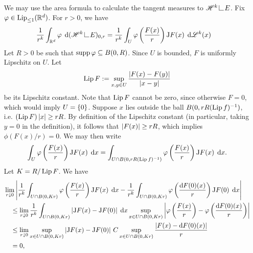 We may use the area formula to calculate the tangent measures to $\scrH^k \restrict E$. Fix $\varphi \in \operatorname{Lip}_{\leq 1}(\mathbb{R}^d)$. For $r > 0$, we have 
\begin{equation} \begin{aligned} 
    \frac{1}{r^k} \int_{\bbR^d} \phi \; \d (\scrH^k \restrict E)_{0,r} &= \frac{1}{r^k} \int_{U} \phi\left(\frac{F(x)}{r}\right) \mathrm{J}F(x) \; \d \scrL^k(x)
\end{aligned} \end{equation}
Let $R > 0$ be such that $\operatorname{supp}{\varphi} \subseteq B(0,R)$. Since $U$ is bounded, $F$ is uniformly Lipschitz on $U$. Let 
\begin{equation}
    \operatorname{Lip}{F} := \sup_{x,y \in U} \frac{\left\vert {F(x) - F(y)} \right\vert}{\left\vert {x - y} \right\vert}
\end{equation}
be its Lipschitz constant. Note that $\operatorname{Lip}{F}$ cannot be zero, since otherwise $F = 0$, which would imply $U = \left\{ {0} \right\}$. Suppose $x$ lies outside the ball $B(0,rR(\operatorname{Lip}{f})^{-1})$, i.e. $(\operatorname{Lip}{F})\left\vert {x} \right\vert \geq rR$. By definition of the Lipschitz constant (in particular, taking $y = 0$ in the definition), it follows that $\left\vert {F(x)} \right\vert \geq rR$, which implies $\phi(F(x)/r) = 0$. We may then write 
\begin{equation}
    \int_U \varphi\left( { \frac{F(x)}{r} } \right) \mathrm{J}F(x) \; \operatorname{d}\!{x} = \int_{U \cap B(0,rR(\operatorname{Lip}{f})^{-1})} \varphi\left( { \frac{F(x)}{r} } \right)  \mathrm{J}F(x) \; \operatorname{d}\!{x}.
\end{equation}
Let $K = R/\operatorname{Lip}{F}$. We have 
\begin{equation} \begin{aligned}
    &\lim_{r \downarrow 0} \left\vert { \frac{1}{r^k} \int_{U \cap B(0,Kr)} \varphi\left( { \frac{F(x)}{r} } \right) \mathrm{J}F(x) \; \ensuremath{\operatorname{d}\!{x}} - \frac{1}{r^k} \int_{U \cap B(0,Kr)} \varphi\left( { \frac{\ensuremath{\operatorname{d}\!{F}}(0)(x)}{r} } \right) \mathrm{J}F(0) \; \ensuremath{\operatorname{d}\!{x}} } \right\vert \\
    &\quad \leq \lim_{r \downarrow 0} \frac{1}{r^k} \int_{U \cap B(0,Kr)} \left\vert {\mathrm{J}F(x) - \mathrm{J}F(0)} \right\vert \; \operatorname{d}\!{x} \sup_{x \in U \cap B(0,Kr)} \left\vert { \varphi\left( {\frac{F(x)}{r}} \right) - \varphi\left( { \frac{\ensuremath{\operatorname{d}\!{F}}(0)(x)}{r} } \right) } \right\vert \\
    &\quad \leq \lim_{r \downarrow 0} \sup_{x \in U \cap B(0,Kr)} \left\vert {\mathrm{J}F(x) - \mathrm{J}F(0)} \right\vert \, C \sup_{x \in U \cap B(0,Kr)} \frac{\left\vert {F(x) - \ensuremath{\operatorname{d}\!{F}}(0)(x)} \right\vert}{r} \\
    &\quad = 0,
\end{aligned} \end{equation}
